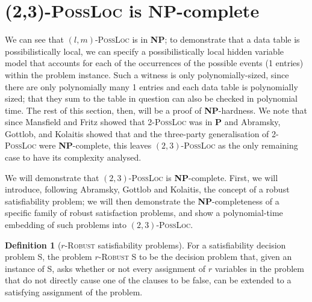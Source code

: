 \documentclass[reprint]{revtex4-1}
\theoremstyle{definition}
\newtheorem{defn}{Definition}
\begin{document}
\section{\textsc{(2,3)-PossLoc} is \textbf{NP}-complete}

We can see that $(l,m)$-\textsc{PossLoc} is in \textbf{NP}; to demonstrate that a data table is possibilistically local, we can specify a possibilistically local hidden variable model that accounts for each of the occurrences of the possible events (1 entries) within the problem instance. Such a witness is only polynomially-sized, since there are only polynomially many 1 entries and each data table is polynomially sized; that they sum to the table in question can also be checked in polynomial time. The rest of this section, then, will be a proof of \textbf{NP}-hardness. We note that since Mansfield and Fritz \cite{Mans2011} showed that \textsc{2-PossLoc} was in \textbf{P} and Abramsky, Gottlob, and Kolaitis showed that   and the three-party generalisation of \textsc{2-PossLoc} were \textbf{NP}-complete, this leaves $(2,3)$-\textsc{PossLoc} as the only remaining case to have its complexity analysed.

We will demonstrate that $(2,3)$-\textsc{PossLoc} is \textbf{NP}-complete. First, we will introduce, following Abramsky, Gottlob and Kolaitis, the concept of a robust satisfiability problem; we will then demonstrate the \textbf{NP}-completeness of a specific family of robust satisfaction problems, and show a polynomial-time embedding of such problems into $(2,3)$-\textsc{PossLoc}.

\begin{defn}[$r$-\textsc{Robust} satisfiability problems]	
For a satisfiability decision problem \textsc{S}, the problem $r$-\textsc{Robust S} to be the decision problem that, given an instance of \textsc{S}, asks whether or not every assignment of $r$ variables in the problem that do not directly cause one of the clauses to be false, can be extended to a satisfying assignment of the problem.
\end{defn}
\end{document}
